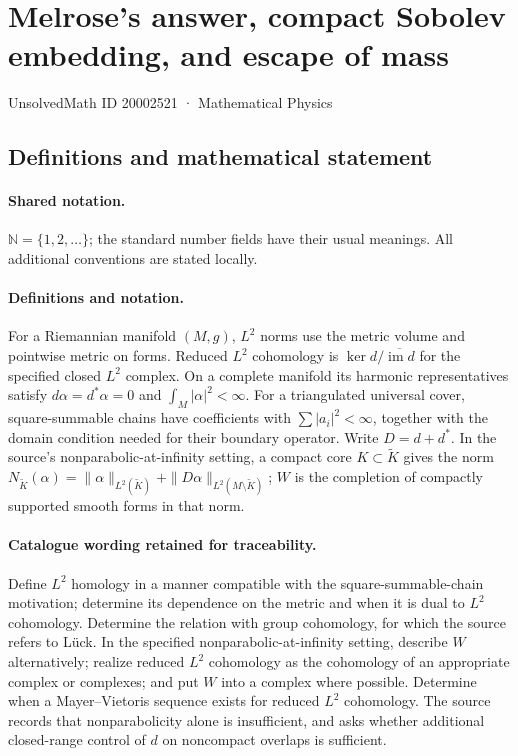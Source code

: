 \documentclass[11pt]{article}
\begin{document}
\setcounter{section}{20002520}
\section{Melrose's answer, compact Sobolev embedding, and escape of mass}\label{20002521}
{\small UnsolvedMath ID 20002521 · Mathematical Physics}
\subsection{Definitions and mathematical statement}

\paragraph{Shared notation.}$\mathbb N=\{1,2,\ldots\}$; the standard number fields have their usual meanings. All additional conventions are stated locally.


\paragraph{Definitions and notation.}For a Riemannian manifold $(M,g)$, $L^2$ norms use the metric volume and pointwise metric on forms. Reduced $L^2$ cohomology is $\ker d/\overline{\operatorname{im}d}$ for the specified closed $L^2$ complex. On a complete manifold its harmonic representatives satisfy $d\alpha=d^*\alpha=0$ and $\int_M|\alpha|^2<\infty$. For a triangulated universal cover, square-summable chains have coefficients with $\sum|a_i|^2<\infty$, together with the domain condition needed for their boundary operator. Write $D=d+d^*$. In the source’s nonparabolic-at-infinity setting, a compact core $K\subset\widetilde K$ gives the norm $N_{\widetilde K}(\alpha)=\|\alpha\|_{L^2(\widetilde K)}+\|D\alpha\|_{L^2(M\setminus\widetilde K)}$; $W$ is the completion of compactly supported smooth forms in that norm.

\paragraph{Catalogue wording retained for traceability.}
Define $L^2$ homology in a manner compatible with the square-summable-chain motivation; determine its dependence on the metric and when it is dual to $L^2$ cohomology. Determine the relation with group cohomology, for which the source refers to Lück. In the specified nonparabolic-at-infinity setting, describe $W$ alternatively; realize reduced $L^2$ cohomology as the cohomology of an appropriate complex or complexes; and put $W$ into a complex where possible. Determine when a Mayer--Vietoris sequence exists for reduced $L^2$ cohomology. The source records that nonparabolicity alone is insufficient, and asks whether additional closed-range control of $d$ on noncompact overlaps is sufficient.
\end{document}
